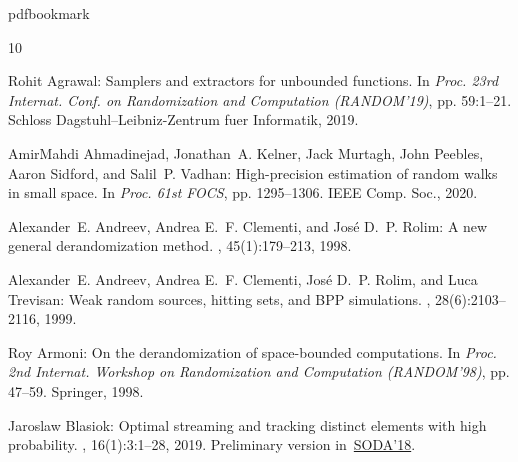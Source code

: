 \newcommand{\prelim}{Preliminary version in\ }\newcommand{\prelims}{Preliminary
  versions in\ }
\providecommand{\bibhead}[1]{}
\expandafter\ifx\csname pdfbookmark\endcsname\relax%
  \providecommand{\tocrefpdfbookmark}{}
\else\providecommand{\tocrefpdfbookmark}{%
   \hypertarget{tocreferences}{}%
   \pdfbookmark[1]{References}{tocreferences}}%
\fi

\tocrefpdfbookmark
\begin{thebibliography}{10}

\bibhead{Agrawal19}
{\sc Rohit Agrawal}: Samplers and extractors for unbounded functions.
\newblock In {\em Proc. 23rd Internat. Conf. on Randomization and Computation
  (RANDOM'19)}, pp. 59:1--21. Schloss Dagstuhl--Leibniz-Zentrum fuer
  Informatik, 2019.

\bibhead{AhmadinejadKeMuPeSiVa19}
{\sc AmirMahdi Ahmadinejad, Jonathan~A. Kelner, Jack Murtagh, John Peebles,
  Aaron Sidford, and Salil~P. Vadhan}: High-precision estimation of random
  walks in small space.
\newblock In {\em Proc. 61st FOCS}, pp. 1295--1306. IEEE Comp. Soc., 2020.

\bibhead{AndreevClRo98}
{\sc Alexander~E. Andreev, Andrea E.~F. Clementi, and Jos{\'e} D.~P. Rolim}: A
  new general derandomization method.
, 45(1):179--213, 1998.
\newblock [\epfmtdoi{10.1145/273865.273933}]

\bibhead{AndreevClRoTr99}
{\sc Alexander~E. Andreev, Andrea E.~F. Clementi, Jos{\'e} D.~P. Rolim, and
  Luca Trevisan}: Weak random sources, hitting sets, and {BPP} simulations.
, 28(6):2103--2116, 1999.
\newblock [\epfmtdoi{10.1137/s0097539797325636}]

\bibhead{Armoni98}
{\sc Roy Armoni}: On the derandomization of space-bounded computations.
\newblock In {\em Proc. 2nd Internat. Workshop on Randomization and Computation
  (RANDOM'98)}, pp. 47--59. Springer, 1998.
\newblock [\epfmtdoi{10.1007/3-540-49543-6\_5}]

\bibhead{Blasiok18}
{\sc Jaroslaw Blasiok}: Optimal streaming and tracking distinct elements with
  high probability.
, 16(1):3:1--28, 2019.
\newblock \prelim \href{https://10.1137/1.9781611975031.156}{SODA'18}.
\newblock [\epfmtdoi{10.1145/3309193}]


\end{thebibliography}
